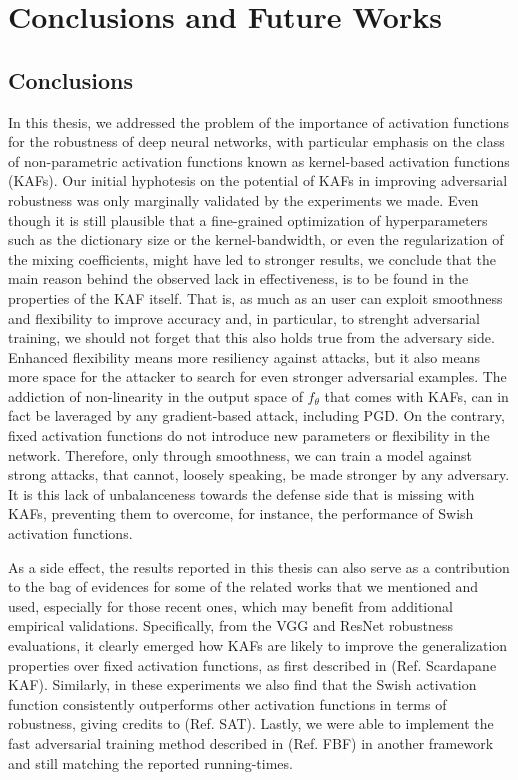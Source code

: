 \documentclass[LaM,binding=0.6cm]{./packages/sapthesis/sapthesis}
\begin{document}
\chapter{Conclusions and Future Works}

        \label{chap:8}
        \section{Conclusions}

        In this thesis, we addressed the problem of the importance of activation functions for the robustness of deep neural networks, 
        with particular emphasis on the class of non-parametric activation functions known as kernel-based activation functions (KAFs).
        Our initial hyphotesis on the potential of KAFs in improving adversarial robustness was only marginally validated by the experiments we made. Even though
        it is still plausible that a fine-grained optimization of hyperparameters such as the dictionary size or the kernel-bandwidth,
        or even the regularization of the mixing coefficients, might have led to stronger results, we conclude that the main reason behind the 
        observed lack in effectiveness, is to be found in the properties of the KAF itself. That is, as much as an user can exploit 
        smoothness and flexibility to improve accuracy and, in particular, to strenght adversarial training, we should not forget that this also holds 
        true from the adversary side. Enhanced flexibility means more resiliency against attacks, but it also means more space for the attacker to 
        search for even stronger adversarial examples. The addiction of non-linearity in the output space of $f_{\theta}$ that comes with KAFs, can in fact
        be laveraged by any gradient-based attack, including PGD. On the contrary, fixed activation functions do not introduce new parameters or flexibility in the network. Therefore,
        only through smoothness, we can train a model against strong attacks, that cannot, loosely speaking, be made stronger by any adversary.
        It is this lack of unbalanceness towards the defense side that is missing with KAFs, preventing them to overcome, for instance, the performance of Swish activation functions.

        As a side effect, the results reported in this thesis can also serve as a contribution to the bag of evidences for 
        some of the related works that we mentioned and used, especially for those recent ones, which may benefit from additional 
        empirical validations. Specifically, from the VGG and ResNet robustness evaluations, it clearly emerged how KAFs are likely to improve
        the generalization properties over fixed activation functions, as first described in (Ref. Scardapane KAF).
        Similarly, in these experiments we also find that the Swish activation function consistently outperforms 
        other activation functions in terms of robustness, giving credits to (Ref. SAT). Lastly, we were able to implement
        the fast adversarial training method described in (Ref. FBF) in another framework and still matching the reported
        running-times.
\end{document}
